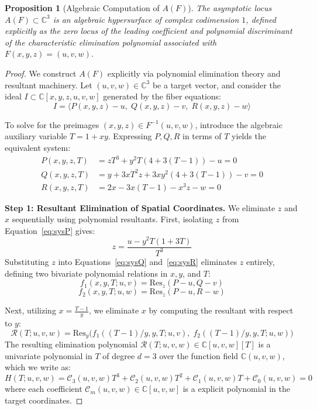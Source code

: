 \documentclass[11pt,reqno]{amsart}
\newtheorem{proposition}[theorem]{Proposition}
\theoremstyle{definition}
\begin{document}
\begin{proposition}[Algebraic Computation of $A(F)$]
The asymptotic locus $A(F) \subset \mathbb{C}^3$ is an algebraic hypersurface of complex codimension $1$, defined explicitly as the zero locus of the leading coefficient and polynomial discriminant of the characteristic elimination polynomial associated with $F(x,y,z) = (u,v,w)$.
\end{proposition}

\begin{proof}
We construct $A(F)$ explicitly via polynomial elimination theory and resultant machinery. Let $(u,v,w) \in \mathbb{C}^3$ be a target vector, and consider the ideal $I \subset \mathbb{C}[x,y,z,u,v,w]$ generated by the fiber equations:
$$I = \big\langle P(x,y,z) - u, \; Q(x,y,z) - v, \; R(x,y,z) - w \big\rangle$$

To solve for the preimages $(x,y,z) \in F^{-1}(u,v,w)$, introduce the algebraic auxiliary variable $T = 1 + xy$. Expressing $P, Q, R$ in terms of $T$ yields the equivalent system:
\begin{align}
P(x,y,z,T) &= z T^3 + y^2 T (4 + 3(T-1)) - u = 0 \label{eq:sysP} \\
Q(x,y,z,T) &= y + 3 x T^2 z + 3 x y^2 (4 + 3(T-1)) - v = 0 \label{eq:sysQ} \\
R(x,y,z,T) &= 2x - 3x(T-1) - x^3 z - w = 0 \label{eq:sysR}
\end{align}

\textbf{Step 1: Resultant Elimination of Spatial Coordinates.}
We eliminate $z$ and $x$ sequentially using polynomial resultants. First, isolating $z$ from Equation~\eqref{eq:sysP} gives:
$$z = \frac{u - y^2 T (1 + 3T)}{T^3}$$
Substituting $z$ into Equations~\eqref{eq:sysQ} and~\eqref{eq:sysR} eliminates $z$ entirely, defining two bivariate polynomial relations in $x, y$, and $T$:
$$f_1(x, y, T; u, v) = \mathrm{Res}_z(P - u, Q - v)$$
$$f_2(x, y, T; u, w) = \mathrm{Res}_z(P - u, R - w)$$

Next, utilizing $x = \frac{T - 1}{y}$, we eliminate $x$ by computing the resultant with respect to $y$:
$$\mathcal{R}(T; u, v, w) = \mathrm{Res}_y \big( f_1((T-1)/y, y, T; u, v), \; f_2((T-1)/y, y, T; u, w) \big)$$
The resulting elimination polynomial $\mathcal{R}(T; u, v, w) \in \mathbb{C}[u,v,w][T]$ is a univariate polynomial in $T$ of degree $d = 3$ over the function field $\mathbb{C}(u,v,w)$, which we write as:
$$H(T; u, v, w) = \mathcal{C}_3(u,v,w) T^3 + \mathcal{C}_2(u,v,w) T^2 + \mathcal{C}_1(u,v,w) T + \mathcal{C}_0(u,v,w) = 0$$
where each coefficient $\mathcal{C}_m(u,v,w) \in \mathbb{C}[u,v,w]$ is a explicit polynomial in the target coordinates.


\end{proof}
\end{document}
